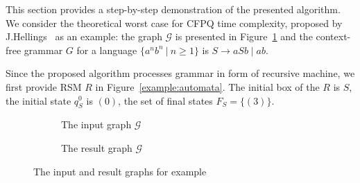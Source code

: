 This section provides a step-by-step demonstration of the presented algorithm.
We consider the theoretical worst case for CFPQ time complexity, proposed by J.Hellings~\cite{hellings2015querying} as an example: the graph $\mathcal{G}$ is presented in Figure~\ref{input:graph} and the context-free grammar $G$ for a language $\{a^n b^n~|~n \geq 1\}$ is $ S \to a S b \mid a b$.

Since the proposed algorithm processes grammar in form of recursive machine, we first provide RSM $R$ in Figure~\ref{example:automata}.
The initial box of the $R$ is $S$, the initial state $q_S^0$ is $(0)$, the set of final states $F_S = \{ (3) \}$.

\begin{figure}[h]
        \centering
        \begin{subfigure}{.48\textwidth}
        \begin{center}
        \caption{The input graph $\mathcal{G}$}
        \label{input:graph}
        \end{center}
        \end{subfigure}
        \begin{subfigure}{.48\textwidth}
        \begin{center}
    \caption{The result graph $\mathcal{G}$}
    \label{example:result}
    \end{center}
    \end{subfigure}
    \caption{The input and result graphs for example}
    \label{example:input_and_result}

\end{figure}


